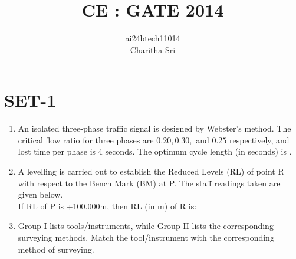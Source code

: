 \documentclass[journal,12pt,onecolumn]{IEEEtran}
\theoremstyle{remark}
\begin{document}


\title{CE : GATE 2014}
\author{ai24btech11014 \\ Charitha Sri}
\maketitle

\section{SET-1}

\begin{enumerate}
    \item An isolated three-phase traffic signal is designed by Webster's method. The critical flow ratio for three phases are $0.20, 0.30,$ and $0.25$ respectively, and lost time per phase is 4 seconds. The optimum cycle length (in seconds) is \underline{\hspace{1cm}}.
 
    \item A levelling is carried out to establish the Reduced Levels (RL) of point R with respect to the Bench Mark (BM) at P. The staff readings taken are given below. \\
 

    If RL of P is +100.000m, then RL (in m) of R is:
    \begin{enumerate}
    \end{enumerate}

    \item Group I lists tools/instruments, while Group II lists the corresponding surveying methods. Match the tool/instrument with the corresponding method of surveying.
   

    \begin{enumerate}
    \end{enumerate}

\end{enumerate}
\end{document}

